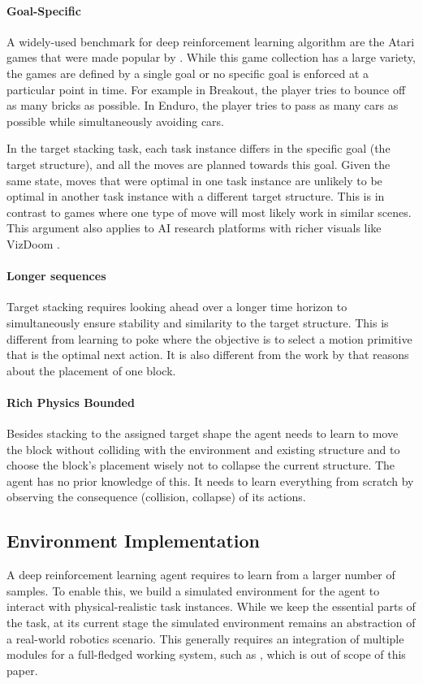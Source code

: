 \documentclass{article} %
\begin{document}
\paragraph{Goal-Specific}
A widely-used benchmark for deep reinforcement learning algorithm are the Atari games \citep{bellemare13arcade} that were made popular by \cite{mnih2013playing}. While this game collection has a large variety, the games are defined by a single goal or no specific goal is enforced at a particular point in time. For example in Breakout, the player tries to bounce off as many bricks as possible. In Enduro, the player tries to pass as many cars as possible while simultaneously avoiding cars. 

In the target stacking task, each task instance differs in the specific goal (the target structure), and all the moves are planned towards this goal. Given the same state, moves that were optimal in one task instance are unlikely to be optimal in another task instance with a different target structure. This is in contrast to games where one type of move will most likely work in similar scenes. This argument also applies to AI research platforms with richer visuals like VizDoom \citep{kempka2016vizdoom}.

\paragraph{Longer sequences}
Target stacking requires looking ahead over a longer time horizon to simultaneously ensure stability and similarity to the target structure. This is different from learning to poke \citep{agrawal2016learning} where the objective is to select a motion primitive that is the optimal next action. It is also different from the work by \cite{li2017visual} that reasons about the placement of one block. 

\paragraph{Rich Physics Bounded}
Besides stacking to the assigned target shape the agent needs to learn to move the block without colliding with the environment and existing structure and to choose the block's placement wisely not to collapse the current structure. The agent has no prior knowledge of this. It needs to learn everything from scratch by observing the consequence (collision, collapse) of its actions.  

\subsection{Environment Implementation}
A deep reinforcement learning agent requires to learn from a larger number of samples. To enable this, we build a simulated environment for the agent to interact with physical-realistic task instances. While we keep the essential parts of the task, at its current stage the simulated environment remains an abstraction of a real-world robotics scenario. This generally requires an integration of multiple modules for a full-fledged working system, such as \cite{toussaint2010integrated}, which is out of scope of this paper.
\end{document}

